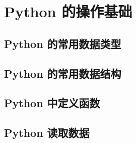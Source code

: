 \chapter{Python 的操作基础}

\section{Python 的常用数据类型}

\section{Python 的常用数据结构}

\section{Python 中定义函数}

\section{Python 读取数据}
